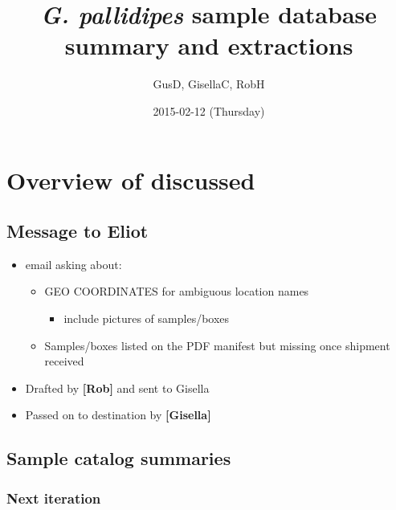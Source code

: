 \documentclass[letterpaper]{scrartcl}
\title{\emph{G. pallidipes} sample database summary and extractions}
\author{GusD, GisellaC, RobH}
\date{2015-02-12 (Thursday)}
\begin{document}
\maketitle

{
\hypersetup{linkcolor=black}
\setcounter{tocdepth}{3}
\tableofcontents
}
\section{Overview of discussed}\label{overview-of-discussed}

\subsection{Message to Eliot}\label{message-to-eliot}

\begin{itemize}
\itemsep1pt\parskip0pt
\item
  email asking about:

  \begin{itemize}
  \itemsep1pt\parskip0pt
  \item
    GEO COORDINATES for ambiguous location names

    \begin{itemize}
    \itemsep1pt\parskip0pt
    \item
      include pictures of samples/boxes
    \end{itemize}
  \item
    Samples/boxes listed on the PDF manifest but missing once shipment
    received
  \end{itemize}
\item
  Drafted by \textbf{{[}Rob{]}} and sent to Gisella
\item
  Passed on to destination by \textbf{{[}Gisella{]}}
\end{itemize}

\subsection{Sample catalog summaries}\label{sample-catalog-summaries}

\subsubsection{Next iteration}\label{next-iteration}
\end{document}
